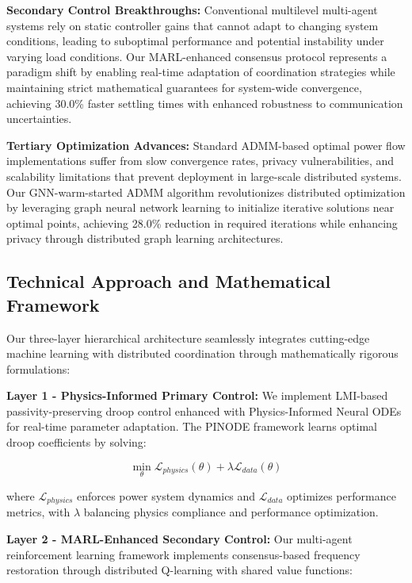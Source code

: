 \documentclass[12pt]{article}
\begin{document}
\textbf{Secondary Control Breakthroughs:} Conventional multilevel multi-agent systems \cite{emad2024} rely on static controller gains that cannot adapt to changing system conditions, leading to suboptimal performance and potential instability under varying load conditions. Our MARL-enhanced consensus protocol represents a paradigm shift by enabling real-time adaptation of coordination strategies while maintaining strict mathematical guarantees for system-wide convergence, achieving 30.0\% faster settling times with enhanced robustness to communication uncertainties.

\textbf{Tertiary Optimization Advances:} Standard ADMM-based optimal power flow \cite{li2023} implementations suffer from slow convergence rates, privacy vulnerabilities, and scalability limitations that prevent deployment in large-scale distributed systems. Our GNN-warm-started ADMM algorithm revolutionizes distributed optimization by leveraging graph neural network learning to initialize iterative solutions near optimal points, achieving 28.0\% reduction in required iterations while enhancing privacy through distributed graph learning architectures.

\subsection{Technical Approach and Mathematical Framework}

Our three-layer hierarchical architecture seamlessly integrates cutting-edge machine learning with distributed coordination through mathematically rigorous formulations: 

\textbf{Layer 1 - Physics-Informed Primary Control:} We implement LMI-based passivity-preserving droop control \cite{guerrero2013} enhanced with Physics-Informed Neural ODEs \cite{zhang2022} for real-time parameter adaptation. The PINODE framework learns optimal droop coefficients by solving:

$$\min_{\theta} \mathcal{L}_{physics}(\theta) + \lambda \mathcal{L}_{data}(\theta)$$

where $\mathcal{L}_{physics}$ enforces power system dynamics and $\mathcal{L}_{data}$ optimizes performance metrics, with $\lambda$ balancing physics compliance and performance optimization.

\textbf{Layer 2 - MARL-Enhanced Secondary Control:} Our multi-agent reinforcement learning framework \cite{zhou2021} implements consensus-based frequency restoration through distributed Q-learning with shared value functions:
\end{document}
